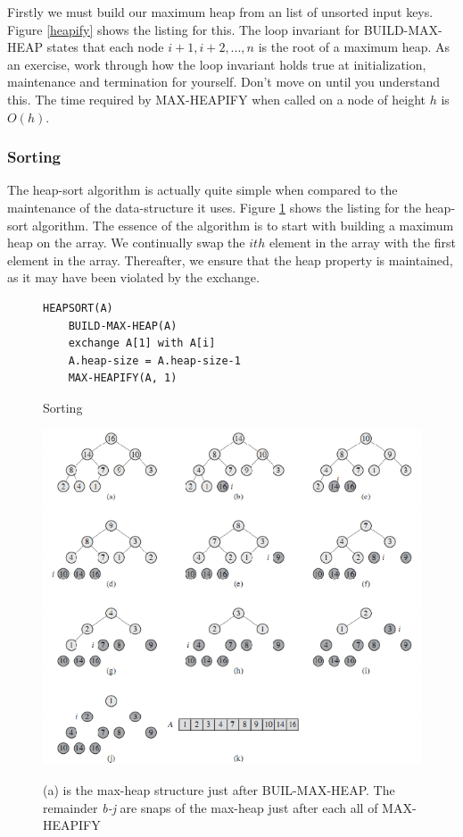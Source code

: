 \documentclass[10pt,a4paper]{article}
\begin{document}
Firstly we  must build our maximum heap from an list of unsorted input keys. Figure \ref{heapify} shows the listing for this. The loop invariant for BUILD-MAX-HEAP states that each node $i+1, i+2,...,n$ is the root of a maximum heap. As an exercise, work through how the loop invariant holds true at initialization, maintenance and termination for yourself. Don't move on until you understand this. The time required by MAX-HEAPIFY when called on a node of height $h$ is $O(h)$.
\subsubsection{Sorting}
The heap-sort algorithm is actually quite simple when compared to the maintenance of the data-structure it uses. Figure \ref{heapsort} shows the listing for the heap-sort algorithm. The essence of the algorithm is to start with building a maximum heap on the array. We continually swap the $ith$ element in the array with the first element in the array. Thereafter, we ensure that the heap property is maintained, as it may have been violated by the exchange. 
\begin{figure}
\caption{Sorting}
\begin{center}
\begin{lstlisting}
HEAPSORT(A)
	BUILD-MAX-HEAP(A)
	exchange A[1] with A[i]
	A.heap-size = A.heap-size-1
	MAX-HEAPIFY(A, 1) 
\end{lstlisting}
\label{heapsort}
\end{center}
\end{figure}

\begin{figure}
\caption{(a) is the max-heap structure just after BUIL-MAX-HEAP. The remainder {\it b-j} are snaps of the max-heap just after each all of MAX-HEAPIFY\cite{INTROALG}}
\begin{center}
\includegraphics[scale=0.58]{../images/heapsort.png}
\label{heap}
\end{center}
\end{figure}
\end{document}
